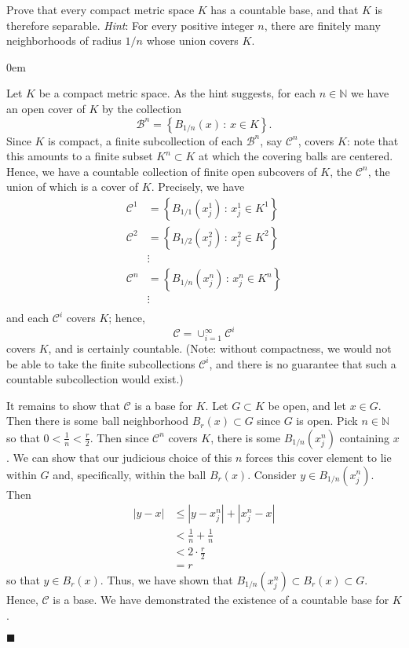\documentclass[12pt]{article}
\renewcommand{\qed}{\hfill$\blacksquare$}
\renewenvironment{proof}{\begin{addmargin}[1em]{0em}\begin{newproof}}{\end{newproof}\end{addmargin}\qed}
\newenvironment{problem}[2][Exercise]{\begin{trivlist}
\item[\hskip \labelsep {\bfseries #1}\hskip \labelsep {\bfseries #2.}]}{\end{trivlist}}
\begin{document}
\begin{problem}{2.25}
Prove that every compact metric space $K$ has a countable base, and that $K$ is therefore separable. \textit{Hint}: For every positive integer $n$, there are finitely many neighborhoods of radius $1/n$ whose union covers $K$.
\end{problem}
\begin{proof}
Let $K$ be a compact metric space. As the hint suggests, for each $n\in \mathbb{N}$ we have an open cover of $K$ by the collection $$\mathcal{B}^n = \left\{ B_{1/n}\left(x\right)\, : \, x\in K \right\}.$$ Since $K$ is compact, a finite subcollection of each $\mathcal{B}^n$, say $\mathcal{C}^n$, covers $K$: note that this amounts to a finite subset $K^n \subset K$ at which the covering balls are centered. Hence, we have a countable collection of finite open subcovers of $K$, the $\mathcal{C}^n$, the union of which is a cover of $K$. Precisely, we have 
\begin{align*}
	\mathcal{C}^1 & = \left\{  B_{1/1}\left(x^1_j\right) \, : \, x^1_j \in K^1 \right\} \\
	\mathcal{C}^2 & = \left\{  B_{1/2}\left(x^2_j\right) \, : \, x^2_j \in K^2 \right\} \\
	 & \vdots \\
		\mathcal{C}^n & = \left\{  B_{1/n}\left(x^n_j\right) \, : \, x^n_j \in K^n \right\} \\
		 & \vdots  \\
\end{align*}
and each $\mathcal{C}^i$ covers $K$; hence, $$ \mathcal{C} = \cup_{i=1}^{\infty} \mathcal{C}^i$$ covers $K$, and is certainly countable. (Note: without compactness, we would not be able to take the finite subcollections $\mathcal{C}^i$, and there is no guarantee that such a countable subcollection would exist.)

It remains to show that $\mathcal{C}$ is a base for $K$. Let $G\subset K$ be open, and let $x\in G$. Then there is some ball neighborhood $B_r\left(x\right)\subset G$ since $G$ is open. Pick $n\in \mathbb{N}$ so that $0 < \frac{1}{n} < \frac{r}{2}$. Then since $\mathcal{C}^n$ covers $K$, there is some $B_{1/n}\left(x_j^n\right)$ containing $x$. We can show that our judicious choice of this $n$ forces this cover element to lie within $G$ and, specifically, within the ball $B_r\left(x\right)$. Consider $y\in B_{1/n}\left(x_j^n\right)$. Then
\begin{align*}
	\left|y-x\right| & \leq \left|y-x_j^n\right| + \left|x_j^n-x\right| \\
	& < \frac{1}{n} + \frac{1}{n} \\
	& < 2 \cdot \frac{r}{2} \\
	& = r
\end{align*}
so that $y \in B_r\left(x\right)$. Thus, we have shown that $B_{1/n}\left(x_j^n\right)\subset B_r\left(x\right) \subset G$. Hence, $\mathcal{C}$ is a base. We have demonstrated the existence of a countable base for $K$.


\end{proof}
\end{document}
